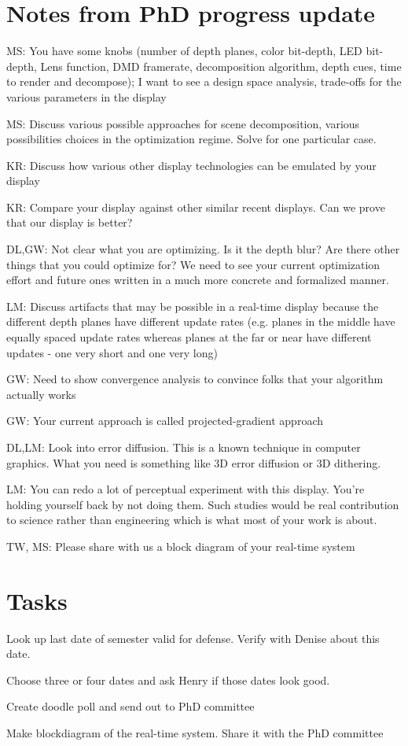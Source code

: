 \section{Notes from PhD progress update}
\begin{compact_itemize}
\item MS: You have some knobs (number of depth planes, color bit-depth, LED bit-depth, Lens function, DMD framerate, decomposition algorithm, depth cues, time to render and decompose); I want to see a design space analysis, trade-offs for the various parameters in the display
\item MS: Discuss various possible approaches for scene decomposition, various possibilities choices in the optimization regime. Solve for one particular case.
\item KR: Discuss how various other display technologies can be emulated by your display
\item KR: Compare your display against other similar recent displays. Can we prove that our display is better?
\item DL,GW: Not clear what you are optimizing. Is it the depth blur? Are there other things that you could optimize for? We need to see your current optimization effort and future ones written in a much more concrete and formalized manner. 
\item LM: Discuss artifacts that may be possible in a real-time display because the different depth planes have different update rates (e.g. planes in the middle have equally spaced update rates whereas planes at the far or near have different updates - one very short and one very long)
\item GW: Need to show convergence analysis to convince folks that your algorithm actually works
\item GW: Your current approach is called projected-gradient approach
\item DL,LM: Look into error diffusion. This is a known technique in computer graphics. What you need is something like 3D error diffusion or 3D dithering.
\item LM: You can redo a lot of perceptual experiment with this display. You're holding yourself back by not doing them. Such studies would be real contribution to science rather than engineering which is what most of your work is about.
\item TW, MS: Please share with us a block diagram of your real-time system
\end{compact_itemize}

\section{Tasks}
\begin{compact_todolist}
\item Look up last date of semester valid for defense. Verify with Denise about this date. 
\item Choose three or four dates and ask Henry if those dates look good.
\item Create doodle poll and send out to PhD committee
\item Make blockdiagram of the real-time system. Share it with the PhD committee
\end{compact_todolist}